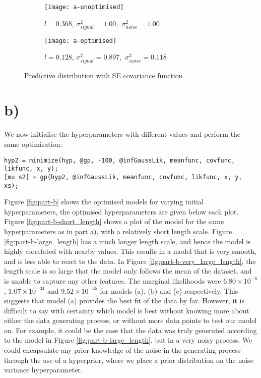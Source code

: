 \documentclass[11pt]{report}
\begin{document}
\begin{figure}[ht]
\centering
\begin{subfigure}{.5\linewidth}
  \centering
  \texttt{[image: a-unoptimised]}
  \caption{\label{fig:part-a-unoptimised}$l = 0.368$, $\sigma_{signal}^{2}=1.00,$ $\sigma_{noise}^{2}=1.00$}
\end{subfigure}%
\begin{subfigure}{.5\linewidth}
  \centering
  \texttt{[image: a-optimised]}
  \caption{\label{fig:part-a-optimised}$l = 0.128$, $\sigma_{signal}^{2}=0.897,$ $\sigma_{noise}^{2}=0.118$}
\end{subfigure}
\caption{\label{fig:part-a}Predictive distribution with SE covariance function}
\end{figure}

\section*{b)}

We now initialise the hyperparameters with different values and perform the same optimisation:
\begin{lstlisting}[basicstyle=\listingsfont]
hyp2 = minimize(hyp, @gp, -100, @infGaussLik, meanfunc, covfunc, likfunc, x, y);
[mu s2] = gp(hyp2, @infGaussLik, meanfunc, covfunc, likfunc, x, y, xs);
\end{lstlisting}
Figure \ref{fig:part-b} shows the optimised models for varying initial hyperparameters, the optimised hyperparameters are given below each plot. Figure \ref{fig:part-b-short_length} shows a plot of the model for the same hyperparameters as in part a), with a relatively short length scale. Figure \ref{fig:part-b-large_length} has a much longer length scale, and hence the model is highly correlated with nearby values. This results in a model that is very smooth, and is less able to react to the data. In Figure \ref{fig:part-b-very_large_length}, the length scale is so large that the model only follows the mean of the dataset, and is unable to capture any other features.  The marginal likelihoods were $6.80 \times 10^{-6}$, $1.07 \times 10^{-34}$ and $9.52 \times 10^{-35}$ for models (a), (b) and (c) respectively. This suggests that model (a) provides the best fit of the data by far. However, it is difficult to say with certainty which model is best without knowing more about either the data generating process, or without more data points to test our model on. For example, it could be the case that the data was truly generated according to the model in Figure \ref{fig:part-b-large_length}, but in a very noisy process. We could encapsulate any prior knowledge of the noise in the generating process through the use of a hyperprior, where we place a prior distribution on the noise variance hyperparameter.
\end{document}
